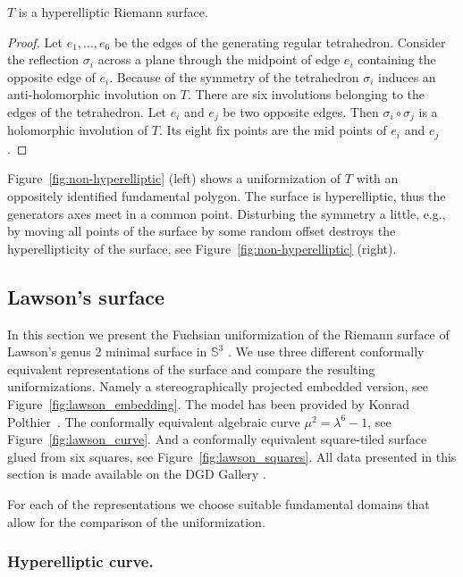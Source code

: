 \documentclass[Thesis.tex]{subfiles}
\begin{document}
  \begin{theorem}
  $T$ is a hyperelliptic Riemann surface.
  \begin{proof}
  Let $e_1,\ldots,e_6$ be the edges of the generating regular tetrahedron. Consider the reflection $\sigma_i$ across a plane through the midpoint of edge $e_i$ containing the opposite edge of $e_i$.  Because of the symmetry of the tetrahedron $\sigma_i$ induces an anti-holomorphic involution on $T$. There are six involutions belonging to the edges of the tetrahedron. Let $e_i$ and $e_j$ be two opposite edges. Then $\sigma_i \circ \sigma_j$ is a holomorphic involution of $T$. Its eight fix points are the mid points of $e_i$ and $e_j$.
  \end{proof}
  \end{theorem}

  Figure~\ref{fig:non-hyperelliptic} (left) shows a uniformization of $T$ with an oppositely identified fundamental polygon. The surface is hyperelliptic, thus the generators axes meet in a common point. Disturbing the symmetry a little, e.g., by moving all points of the surface by some random offset destroys the hyperellipticity of the surface, see Figure~\ref{fig:non-hyperelliptic} (right).



  \subsection{Lawson's surface}

  In this section we present the Fuchsian uniformization of the Riemann surface of Lawson's genus 2 minimal surface in $\mathbb{S}^3$ \cite{Law1970}.
  We use three different conformally equivalent representations of the surface and compare the resulting uniformizations.
  Namely a stereographically projected embedded version, see Figure~\ref{fig:lawson_embedding}.
  The model has been provided by Konrad Polthier~\cite{polthier97}.
  The conformally equivalent algebraic curve $\mu^2=\lambda^6-1$, see Figure~\ref{fig:lawson_curve}.
  And a conformally equivalent square-tiled surface glued from six squares, see Figure~\ref{fig:lawson_squares}.
  All data presented in this section is made available on the {\sc DGD Gallery} \cite{gallery-lawson-webpage}.

  For each of the representations we choose suitable fundamental domains that allow for the comparison of the uniformization.

  \subsubsection{Hyperelliptic curve.}
  \label{sec:lawson_curve}
\end{document}
